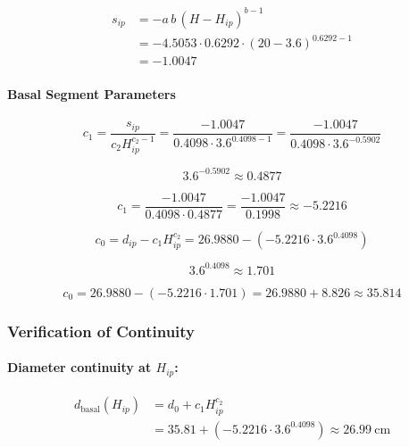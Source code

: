\documentclass[twocolumn, bibliography=totoc]{scrartcl}
\begin{document}
\begin{equation}
\begin{aligned}
s_{ip}
&=
-a\,b\,(H-H_{ip})^{b-1} \\
&=
-4.5053 \cdot 0.6292 \cdot (20 - 3.6)^{0.6292 - 1} \\
&=
-1.0047
\end{aligned}
\end{equation}

\paragraph{Basal Segment Parameters}

\begin{equation}
c_1
=
\frac{s_{ip}}
     {c_2 H_{ip}^{c_2-1}}
=
\frac{-1.0047}{0.4098 \cdot 3.6^{0.4098-1}}
=
\frac{-1.0047}{0.4098 \cdot 3.6^{-0.5902}}
\end{equation}

\begin{equation}
3.6^{-0.5902} \approx 0.4877
\end{equation}

\begin{equation}
c_1 = \frac{-1.0047}{0.4098 \cdot 0.4877} 
      = \frac{-1.0047}{0.1998} 
      \approx -5.2216
\end{equation}

\begin{equation}
c_0
=
d_{ip}
-
c_1 H_{ip}^{c_2}
=
26.9880
-
(-5.2216 \cdot 3.6^{0.4098})
\end{equation}

\begin{equation}
3.6^{0.4098} \approx 1.701
\end{equation}

\begin{equation}
c_0 = 26.9880 - (-5.2216 \cdot 1.701)
      = 26.9880 + 8.826
      \approx 35.814
\end{equation}

\subsubsection*{Verification of Continuity}

\paragraph{Diameter continuity at $H_{ip}$:}

\begin{equation}
\begin{aligned}
d_{\text{basal}}(H_{ip})
&= d_0 + c_1 H_{ip}^{c_2} \\
&= 35.81 + (-5.2216 \cdot 3.6^{0.4098}) 
\approx 26.99\ \text{cm}
\end{aligned}
\end{equation}
\end{document}

